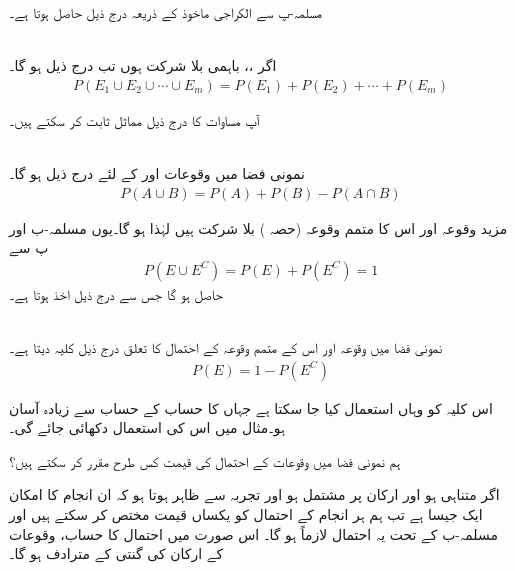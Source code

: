 مسلمہ-پ سے الکراجی ماخوذ کے ذریعہ درج ذیل حاصل ہوتا ہے۔

\quad {}\\
اگر ،،  باہمی بلا شرکت ہوں تب درج ذیل ہو گا۔
\begin{align}
P(E_1\cup E_2\cup \cdots \cup E_m)=P(E_1)+P(E_2)+\cdots+P(E_m)
\end{align}

آپ مساوات  کا درج ذیل مماثل  ثابت کر سکتے ہیں۔

\quad {}\\
نمونی فضا  میں وقوعات  اور  کے لئے درج ذیل ہو گا۔
\begin{align}
P(A\cup B)=P(A)+P(B)-P(A\cap B)
\end{align}

مزید وقوعہ  اور اس کا متمم وقوعہ  (حصہ ) بلا شرکت ہیں لہٰذا  ہو گا۔یوں مسلمہ-ب اور پ سے 
\begin{align*}
P(E\cup E^C)=P(E)+P(E^C)=1
\end{align*}
حاصل ہو گا جس سے درج ذیل اخذ ہوتا ہے۔

\quad {}\\
نمونی فضا  میں وقوعہ  اور اس کے متمم وقوعہ  کے احتمال کا تعلق درج ذیل کلیہ دیتا ہے۔
\begin{align}
P(E)=1-P(E^C)
\end{align}  

اس کلیہ کو وہاں استعمال کیا جا سکتا ہے جہاں  کا حساب  کے حساب سے زیادہ آسان ہو۔مثال  میں اس کی استعمال دکھائی جائے گی۔

ہم نمونی فضا  میں وقوعات کے احتمال کی قیمت کس طرح مقرر کر سکتے ہیں؟

اگر  متناہی ہو اور  ارکان پر مشتمل ہو اور تجربہ سے ظاہر ہوتا ہو کہ ان  انجام کا امکان ایک جیسا ہے تب ہم ہر انجام کے احتمال کو  یکساں قیمت مختص کر سکتے ہیں اور مسلمہ-ب کے تحت یہ احتمال لازماً  ہو گا۔ اس صورت میں احتمال کا حساب، وقوعات کے ارکان کی گنتی کے مترادف ہو گا۔

